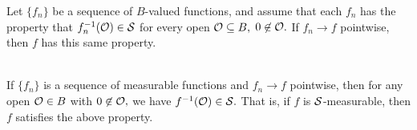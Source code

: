 \begin{lemma}
Let $\{f_n\}$ be a sequence of $B$-valued functions, and assume that each $f_n$ has the property that $f_n^{-1}(\mathcal{O})\in\mathcal{S}$ for every open $\mathcal{O}\subseteq B,$ $0\not\in\mathcal{O}.$ If $f_n\rightarrow f$ pointwise, then $f$ has this same property. \\ \\
\end{lemma}

\begin{cor}
If $\{f_n\}$ is a sequence of measurable functions and $f_n\rightarrow f$ pointwise, then for any open $\mathcal{O}\in B$ with $0\not\in\mathcal{O},$ we have $f^{-1}(\mathcal{O})\in\mathcal{S}.$ That is, if $f$ is $\mathcal{S}$-measurable, then $f$ satisfies the above property.
\end{cor}

